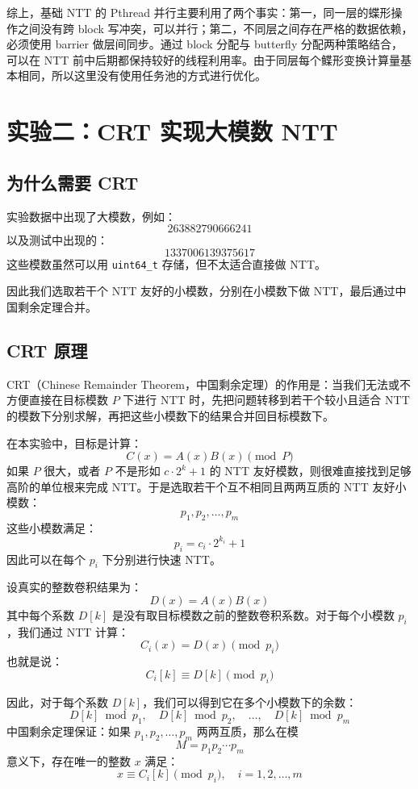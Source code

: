 \documentclass[a4paper]{article}
\begin{document}
综上，基础 NTT 的 Pthread 并行主要利用了两个事实：第一，同一层的蝶形操作之间没有跨 block 写冲突，可以并行；第二，不同层之间存在严格的数据依赖，必须使用 barrier 做层间同步。通过 block 分配与 butterfly 分配两种策略结合，可以在 NTT 前中后期都保持较好的线程利用率。由于同层每个鲽形变换计算量基本相同，所以这里没有使用任务池的方式进行优化。

\section{实验二：CRT 实现大模数 NTT}

\subsection{为什么需要 CRT}

实验数据中出现了大模数，例如：
\[
263882790666241
\]
以及测试中出现的：
\[
1337006139375617
\]
这些模数虽然可以用 \texttt{uint64\_t} 存储，但不太适合直接做 NTT。

因此我们选取若干个 NTT 友好的小模数，分别在小模数下做 NTT，最后通过中国剩余定理合并。

\subsection{CRT 原理}

CRT（Chinese Remainder Theorem，中国剩余定理）的作用是：当我们无法或不方便直接在目标模数 $P$ 下进行 NTT 时，先把问题转移到若干个较小且适合 NTT 的模数下分别求解，再把这些小模数下的结果合并回目标模数下。

在本实验中，目标是计算：
\[
C(x)=A(x)B(x)\pmod P
\]
如果 $P$ 很大，或者 $P$ 不是形如 $c\cdot 2^k+1$ 的 NTT 友好模数，则很难直接找到足够高阶的单位根来完成 NTT。于是选取若干个互不相同且两两互质的 NTT 友好小模数：
\[
p_1,p_2,\ldots,p_m
\]
这些小模数满足：
\[
p_i=c_i\cdot 2^{k_i}+1
\]
因此可以在每个 $p_i$ 下分别进行快速 NTT。

设真实的整数卷积结果为：
\[
D(x)=A(x)B(x)
\]
其中每个系数 $D[k]$ 是没有取目标模数之前的整数卷积系数。对于每个小模数 $p_i$，我们通过 NTT 计算：
\[
C_i(x)=D(x)\pmod {p_i}
\]
也就是说：
\[
C_i[k]\equiv D[k]\pmod {p_i}
\]

因此，对于每个系数 $D[k]$，我们可以得到它在多个小模数下的余数：
\[
D[k]\bmod p_1,\quad D[k]\bmod p_2,\quad \ldots,\quad D[k]\bmod p_m
\]
中国剩余定理保证：如果 $p_1,p_2,\ldots,p_m$ 两两互质，那么在模
\[
M=p_1p_2\cdots p_m
\]
意义下，存在唯一的整数 $x$ 满足：
\[
x\equiv C_i[k]\pmod {p_i},\quad i=1,2,\ldots,m
\]
\end{document}
